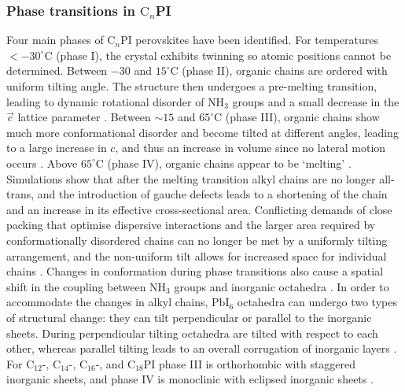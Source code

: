 \subsubsection{Phase transitions in $\textrm{C}_n$PI}
Four main phases of $\textrm{C}_n$PI perovskites have been identified. For temperatures $< -30^{\circ}$C (phase I), the crystal exhibits twinning so atomic positions cannot be determined. Between $-30$ and $15^{\circ}$C  (phase II), organic chains are ordered with uniform tilting angle. The structure then undergoes a pre-melting transition, leading to dynamic rotational disorder of $\textrm{NH}_3$ groups and a small decrease in the $\vec{c}$ lattice parameter \cite{Barman2003}. Between $\sim 15$ and $65^{\circ}$C (phase III), organic chains show much more conformational disorder and become tilted at different angles, leading to a large increase in $c$, and thus an increase in volume since no lateral motion occurs \cite{Barman2003}. Above $65^{\circ}$C (phase IV), organic chains appear to be `melting' \cite{Ishihara1990, Xu1991, Ishihara1989}. Simulations show that after the melting transition alkyl chains are no longer all-trans, and the introduction of gauche defects leads to a shortening of the chain and an increase in its effective cross-sectional area. Conflicting demands of close packing that optimise dispersive interactions and the larger area required by conformationally disordered chains can no longer be met by a uniformly tilting arrangement, and the non-uniform tilt allows for increased space for individual chains \cite{Naik2010}. Changes in conformation during phase transitions also cause a spatial shift in the coupling between $\textrm{NH}_3$ groups and inorganic octahedra \cite{Pradeesh2009}. In order to accommodate the changes in alkyl chains, $\textrm{PbI}_6$ octahedra can undergo two types of structural change: they can tilt perpendicular or parallel to the inorganic sheets. During perpendicular tilting octahedra are tilted with respect to each other, whereas parallel tilting leads to an overall corrugation of inorganic layers \cite{Billing2008}. For $\textrm{C}_{12}$-, $\textrm{C}_{14}$-, $\textrm{C}_{16}$-, and $\textrm{C}_{18}$PI phase III is orthorhombic with staggered inorganic sheets, and phase IV is monoclinic with eclipsed inorganic sheets \cite{Billing2008}.    

